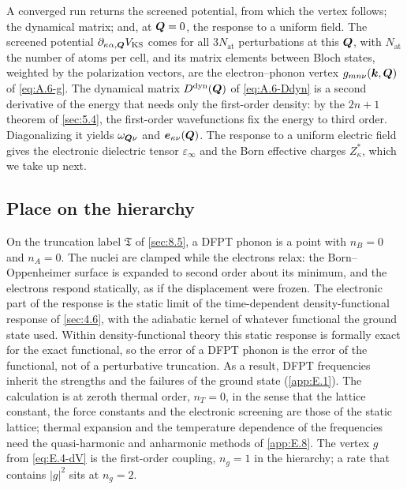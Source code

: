 A converged run returns the screened potential, from which the vertex follows; the dynamical matrix; and, at $\bm{Q} = 0$, the response to a uniform field. The screened potential $\partial_{\kappa\alpha,\bm{Q}}V_{\mathrm{KS}}$ comes for all $3N_{\mathrm{at}}$ perturbations at this $\bm{Q}$, with $N_{\mathrm{at}}$ the number of atoms per cell, and its matrix elements between Bloch states, weighted by the polarization vectors, are the electron--phonon vertex $g_{mn\nu}(\bm{k},\bm{Q})$ of \cref{eq:A.6-g}. The dynamical matrix $D^{\mathrm{dyn}}(\bm{Q})$ of \cref{eq:A.6-Ddyn} is a second derivative of the energy that needs only the first-order density: by the $2n+1$ theorem of \cref{sec:5.4}, the first-order wavefunctions fix the energy to third order. Diagonalizing it yields $\omega_{\bm{Q}\nu}$ and $\bm{e}_{\kappa\nu}(\bm{Q})$. The response to a uniform electric field gives the electronic dielectric tensor $\varepsilon_\infty$ and the Born effective charges $Z^*_\kappa$, which we take up next.

\subsection{Place on the hierarchy}

On the truncation label $\mathfrak{T}$ of \cref{sec:8.5}, a DFPT phonon is a point with $n_B = 0$ and $n_A = 0$. The nuclei are clamped while the electrons relax: the Born--Oppenheimer surface is expanded to second order about its minimum, and the electrons respond statically, as if the displacement were frozen. The electronic part of the response is the static limit of the time-dependent density-functional response of \cref{sec:4.6}, with the adiabatic kernel of whatever functional the ground state used. Within density-functional theory this static response is formally exact for the exact functional, so the error of a DFPT phonon is the error of the functional, not of a perturbative truncation. As a result, DFPT frequencies inherit the strengths and the failures of the ground state (\cref{app:E.1}). The calculation is at zeroth thermal order, $n_T = 0$, in the sense that the lattice constant, the force constants and the electronic screening are those of the static lattice; thermal expansion and the temperature dependence of the frequencies need the quasi-harmonic and anharmonic methods of \cref{app:E.8}. The vertex $g$ from \cref{eq:E.4-dV} is the first-order coupling, $n_g = 1$ in the hierarchy; a rate that contains $|g|^2$ sits at $n_g = 2$.


